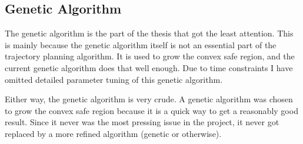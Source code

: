 \subsection{Genetic Algorithm}
The genetic algorithm is the part of the thesis that got the least attention. This is mainly because the genetic algorithm itself is not an essential part of the trajectory planning algorithm. It is used to grow the convex safe region, and the current genetic algorithm does that well enough. Due to time constraints I have omitted detailed parameter tuning of this genetic algorithm.
\par
Either way, the genetic algorithm is very crude. A genetic algorithm was chosen to grow the convex safe region because it is a quick way to get a reasonably good result.  Since it never was the most pressing issue in the project, it never got replaced by a more refined algorithm (genetic or otherwise). 


